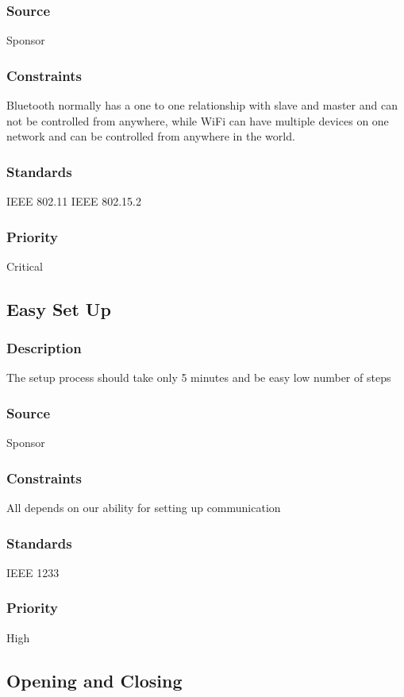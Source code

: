 \subsubsection{Source}
Sponsor
\subsubsection{Constraints}
Bluetooth normally has a one to one relationship with slave and master and can not be controlled from anywhere, while WiFi can have multiple devices on one network and can be controlled from anywhere in the world.


\subsubsection{Standards}
IEEE 802.11
IEEE 802.15.2

\subsubsection{Priority}
Critical

\subsection{Easy Set Up}
\subsubsection{Description}
The setup process should take only 5 minutes and be easy low number of steps 


\subsubsection{Source}
Sponsor
\subsubsection{Constraints}
All depends on our ability for setting up communication


\subsubsection{Standards}
IEEE 1233
\subsubsection{Priority}
High

\subsection{Opening and Closing}
